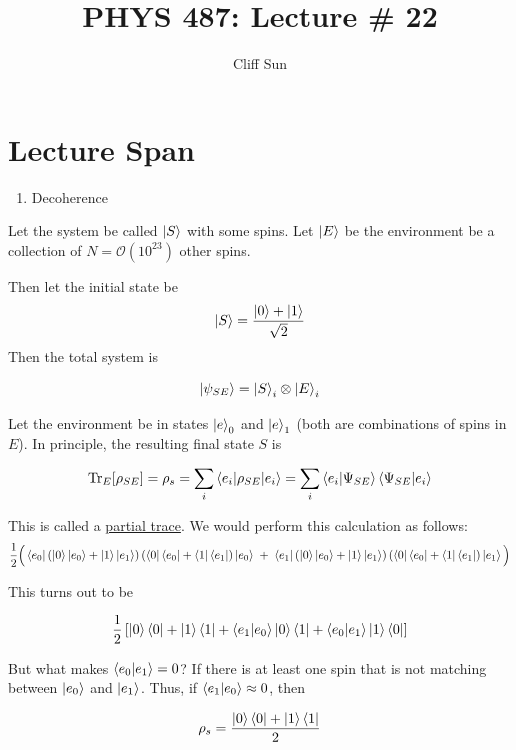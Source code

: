 \documentclass{article}
\title{PHYS 487: Lecture \# 22}
\author{Cliff Sun}
\newtheorem{one minute paper}[theorem]{One Minute Paper}
\begin{document}
\maketitle

\section*{Lecture Span}
\begin{enumerate}
    \item Decoherence
\end{enumerate}

Let the system be called $\ket{S}$ with some spins. Let $\ket{E}$ be the environment be a collection of $N = \mathcal{O}(10^{23})$ other spins. 

Then let the initial state be $$\ket{S} = \frac{\ket{0} + \ket{1}}{\sqrt{2}}$$ Then the total system is 

$$\ket{\psi_{SE}} = \ket{S}_i \otimes \ket{E}_i$$

Let the environment be in states $\ket{e}_0$ and $\ket{e}_1$ (both are combinations of spins in $E$). In principle, the resulting final state $S$ is 

\begin{equation}
    \Tr_{E}[\rho_{SE}] = \rho_s = \sum_i \braket{e_i | \rho_{SE} | e_i} = \sum_i \braket{e_i | \Psi_{SE}}\braket{\Psi_{SE} | e_i}
\end{equation}

This is called a \underline{partial trace}. We would perform this calculation as follows: 
\begin{align}
\frac{1}{2}
\Big(
\bra{e_0}
\left( \ket{0}\ket{e_0} + \ket{1}\ket{e_1} \right)
\left( \bra{0}\bra{e_0} + \bra{1}\bra{e_1} \right)
\ket{e_0}
\;+\;
\bra{e_1}
\left( \ket{0}\ket{e_0} + \ket{1}\ket{e_1} \right)
\left( \bra{0}\bra{e_0} + \bra{1}\bra{e_1} \right)
\ket{e_1}
\Big)
\end{align}

This turns out to be 

\begin{equation}
    \frac{1}{2}\left[ \ket{0}\bra{0} + \ket{1}\bra{1} + \braket{e_1 | e_0}\ket{0}\bra{1} + \braket{e_0|e_1}\ket{1}\bra{0} \right]
\end{equation}

But what makes $\braket{e_0|e_1} = 0$? If there is at least one spin that is not matching between $\ket{e_0}$ and $\ket{e_1}$. Thus, if $\braket{e_1|e_0} \approx 0$, then 

\begin{equation}
    \rho_s = \frac{\ket{0}\bra{0} + \ket{1}\bra{1}}{2}
\end{equation}
\end{document}
